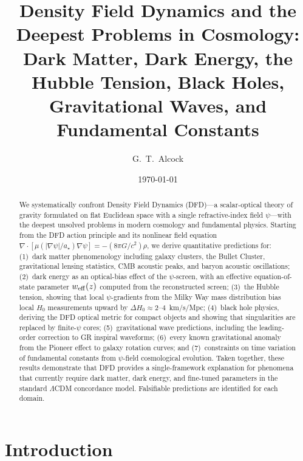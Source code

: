 \documentclass[aps,prd,twocolumn,superscriptaddress,nofootinbib]{revtex4-2}
\begin{document}
\title{Density Field Dynamics and the Deepest Problems in Cosmology:\\
Dark Matter, Dark Energy, the Hubble Tension, Black Holes,\\
Gravitational Waves, and Fundamental Constants}

\author{G.~T.~Alcock}

\date{\today}

\begin{abstract}
We systematically confront Density Field Dynamics (DFD)---a scalar-optical
theory of gravity formulated on flat Euclidean space with a single
refractive-index field $\psi$---with the deepest unsolved problems in
modern cosmology and fundamental physics. Starting from the DFD action
principle and its nonlinear field equation
$\nabla\cdot[\mu(|\nabla\psi|/a_\star)\nabla\psi] = -(8\pi G/c^2)\rho$,
we derive quantitative predictions for: (1)~dark matter phenomenology
including galaxy clusters, the Bullet Cluster, gravitational lensing
statistics, CMB acoustic peaks, and baryon acoustic oscillations;
(2)~dark energy as an optical-bias effect of the $\psi$-screen, with
an effective equation-of-state parameter $w_{\rm eff}(z)$ computed from
the reconstructed screen; (3)~the Hubble tension, showing that local
$\psi$-gradients from the Milky Way mass distribution bias local
$H_0$ measurements upward by $\Delta H_0 \approx 2$--$4$~km/s/Mpc;
(4)~black hole physics, deriving the DFD optical metric for compact
objects and showing that singularities are replaced by finite-$\psi$
cores; (5)~gravitational wave predictions, including the leading-order
correction to GR inspiral waveforms; (6)~every known gravitational
anomaly from the Pioneer effect to galaxy rotation curves; and
(7)~constraints on time variation of fundamental constants from
$\psi$-field cosmological evolution. Taken together, these results
demonstrate that DFD provides a single-framework explanation for
phenomena that currently require dark matter, dark energy, and
fine-tuned parameters in the standard $\Lambda$CDM concordance model.
Falsifiable predictions are identified for each domain.
\end{abstract}

\maketitle

\section{Introduction}\label{sec:intro}
\end{document}
